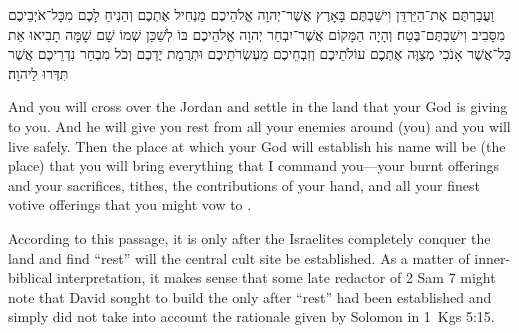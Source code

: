 \begin{hebrewtext}
    וַעֲבַרְתֶּם אֶת־הַיַּרְדֵּן וִישַׁבְתֶּם בָּאָרֶץ אֲשֶׁר־יְהוָה אֱלֹהֵיכֶם מַנְחִיל אֶתְכֶם וְהֵנִיחַ לָכֶם מִכָּל־אֹיְבֵיכֶם מִסָּבִיב וִישַׁבְתֶּם־בֶּטַח׃ 
    וְהָיָה הַמָּקוֹם אֲשֶׁר־יִבְחַר יְהוָה אֱלֹהֵיכֶם בּוֹ לְשַׁכֵּן שְׁמוֹ שָׁם שָׁמָּה תָבִיאוּ אֵת כָּל־אֲשֶׁר אָנֹכִי מְצַוֶּה אֶתְכֶם עוֹלֹתֵיכֶם וְזִבְחֵיכֶם מַעְשְׂרֹתֵיכֶם וּתְרֻמַת יֶדְכֶם וְכֹל מִבְחַר נִדְרֵיכֶם אֲשֶׁר תִּדְּרוּ לַיהוָה׃
\end{hebrewtext}
\begin{translation}
    And you will cross over the Jordan and settle in the land that \yahweh your God is giving to you. And he will give you rest from all your enemies around (you) and you will live safely.
    Then the place at which \yahweh your God will establish his name will be (the place) that you will bring everything that I command you---your burnt offerings and your sacrifices, tithes, the contributions of your hand, and all your finest votive offerings that you might vow to \yahweh.
\end{translation}
\noindent
According to this passage, it is only after the Israelites completely conquer the land and find ``rest'' will the central cult site be established.  As a matter of inner-biblical interpretation, it makes sense that some late redactor of 2 Sam 7 might note that David sought to build the \temple only after ``rest'' had been established and simply did not take into account the rationale given by Solomon in 1~Kgs 5:15.

